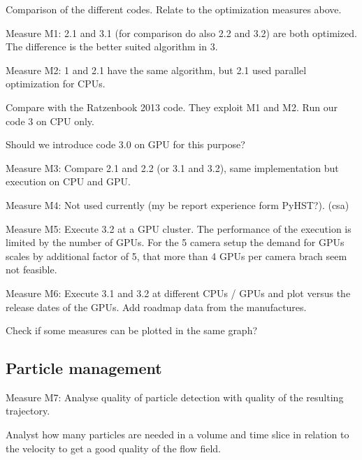 Comparison of the different codes. Relate to the optimization measures above. 



Measure M1: 2.1 and 3.1 (for comparison do also 2.2 and 3.2) are both optimized. The difference is the better suited algorithm in 3. 



Measure M2: 1 and 2.1 have the same algorithm, but 2.1 used parallel optimization for CPUs. 

Compare with the Ratzenbook 2013 code. They exploit M1 and M2. Run our code 3 on CPU only.

Should we introduce code 3.0 on GPU for this purpose?



Measure M3: Compare 2.1 and 2.2 (or 3.1 and 3.2), same implementation but execution on CPU and GPU. 



Measure M4: Not used currently (my be report experience form PyHST?). (csa)



Measure M5: Execute 3.2 at a GPU cluster. The performance of the execution is limited by the number of GPUs. For the 5 camera setup the demand for GPUs scales by additional factor of 5, that more than 4 GPUs per camera brach seem not feasible. 



Measure M6: Execute 3.1 and 3.2 at different CPUs / GPUs and plot versus the release dates of the GPUs. Add roadmap data from the manufactures. 



Check if some measures can be plotted in the same graph? 









\subsection{Particle management}



Measure M7: Analyse quality of particle detection with quality of the resulting trajectory.

Analyst how many particles are needed in a volume and time slice in relation to the velocity to get a good quality of the flow field.







